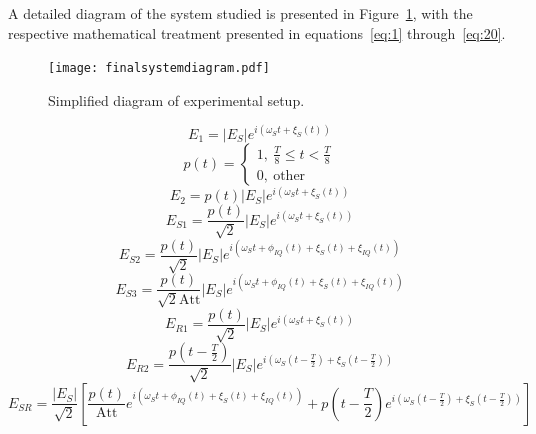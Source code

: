 A detailed diagram of the system studied is presented in Figure~\ref{fig:theoexpDia}, with the respective mathematical treatment presented in equations~\eqref{eq:1} through~\eqref{eq:20}.

\begin{figure}
\centering
\texttt{[image: finalsystemdiagram.pdf]}
\caption{Simplified diagram of experimental setup.}
\label{fig:theoexpDia}
\end{figure}

\begin{equation}\label{eq:1}
E_1=|E_S|e^{i\left(\omega_St+\xi_S(t)\right)}
\end{equation}
\begin{equation}\label{eq:2}
p(t)=
\begin{cases}
1,~\frac{T}{8}\leq t<\frac{T}{8}\\
0,~\text{other}
\end{cases}
\end{equation}
\begin{equation}\label{eq:3}
E_2=p(t)|E_S|e^{i\left(\omega_St+\xi_S(t)\right)}
\end{equation}
\begin{equation}\label{eq:4}
E_{S1}=\frac{p(t)}{\sqrt{2}}|E_S|e^{i\left(\omega_St+\xi_S(t)\right)}
\end{equation}
\begin{equation}\label{eq:5}
E_{S2}=\frac{p(t)}{\sqrt{2}}|E_S|e^{i\left(\omega_St+\phi_{IQ}(t)+\xi_S(t)+\xi_{IQ}(t)\right)}
\end{equation}
\begin{equation}\label{eq:6}
E_{S3}=\frac{p(t)}{\sqrt{2}\text{Att}}|E_S|e^{i\left(\omega_St+\phi_{IQ}(t)+\xi_S(t)+\xi_{IQ}(t)\right)}
\end{equation}
\begin{equation}\label{eq:7}
E_{R1}=\frac{p(t)}{\sqrt{2}}|E_S|e^{i\left(\omega_St+\xi_S(t)\right)}
\end{equation}
\begin{equation}\label{eq:8}
E_{R2}=\frac{p(t-\frac{T}{2})}{\sqrt{2}}|E_S|e^{i\left(\omega_S(t-\frac{T}{2})+\xi_S(t-\frac{T}{2})\right)}
\end{equation}
\begin{equation}\label{eq:9}
E_{SR}=\frac{|E_S|}{\sqrt{2}}\left[\frac{p(t)}{\text{Att}}e^{i\left(\omega_St+\phi_{IQ}(t)+\xi_S(t)+\xi_{IQ}(t)\right)}+p\left(t-\frac{T}{2}\right)e^{i\left(\omega_S\left(t-\frac{T}{2}\right)+\xi_S\left(t-\frac{T}{2}\right)\right)}\right]
\end{equation}
